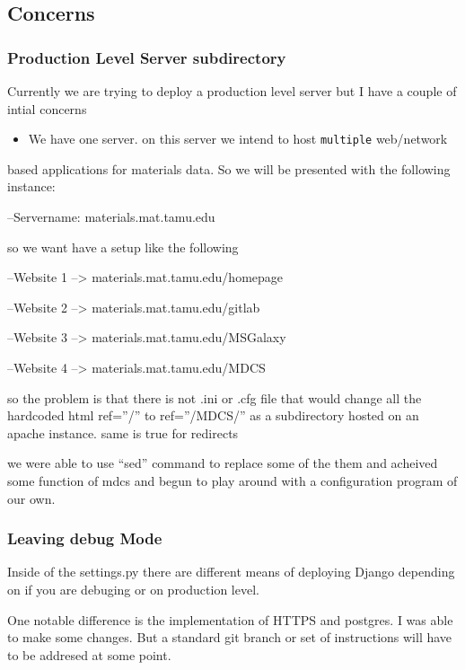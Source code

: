 \documentclass[11pt]{article}
\begin{document}
\subsection{Concerns}
\label{sec-1-3}

   
\subsubsection{Production Level Server subdirectory}
\label{sec-1-3-1}

    Currently we are trying to deploy a production level server but I have a 
    couple of intial concerns
    
\begin{itemize}
\item We have one server. on this server we intend to host \verb~multiple~ web/network
\end{itemize}
    based applications for materials data. So we will be presented with the 
    following instance:
    
    --Servername: materials.mat.tamu.edu
    
    so we want have a setup like the following 

    --Website 1 --> materials.mat.tamu.edu/homepage

    --Website 2 --> materials.mat.tamu.edu/gitlab

    --Website 3 --> materials.mat.tamu.edu/MSGalaxy

    --Website 4 --> materials.mat.tamu.edu/MDCS

    so the problem is that there is not .ini or .cfg file that would change all 
    the hardcoded html ref=''/'' to ref=''\//MDCS/'' as a subdirectory hosted on
    an apache instance. same is true for redirects

    we were able to use ``sed'' command to replace some of the them and acheived 
    some function of mdcs and begun to play around with a configuration program
    of our own.
\subsubsection{Leaving debug Mode}
\label{sec-1-3-2}


    Inside of the settings.py there are different means of deploying Django 
    depending on if you are debuging or on production level.

    One notable difference is the implementation of HTTPS and postgres. I was
    able to make some changes. But a standard git branch or set of instructions
    will have to be addresed at some point.
      
\end{document}
